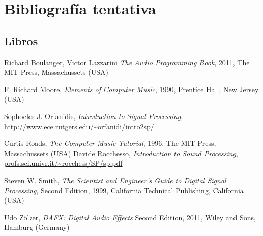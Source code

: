 \documentclass[a4paper,spanish,12pt]{article}
\begin{document}


    
    \maketitle
    
\newpage
\tableofcontents
\newpage

\newpage

\newpage

\newpage



\newpage\section{Bibliografía tentativa}
\subsection{Libros}
\begin{thebibliography}{9}
  Richard Boulanger, Victor Lazzarini
  \emph{The Audio Programming Book},
  2011, The MIT Press, Massachussets (USA)
 
  F. Richard Moore,
  \emph{Elements of Computer Music},
  1990, Prentice Hall, New Jersey (USA)

  Sophocles J. Orfanidis,
  \emph{Introduction to Signal Processing}, \\
  \url{http://www.ece.rutgers.edu/~orfanidi/intro2sp/}
  
  Curtis Roads,
  \emph{The Computer Music Tutorial},
  1996, The MIT Press, Massachussets (USA)
  Davide Rocchesso,
  \emph{Introduction to Sound Processing},
  \url{profs.sci.univr.it/~rocchess/SP/sp.pdf}
  
  Steven W. Smith,
  \emph{The Scientist and Engineer's Guide to Digital Signal Processing},
  Second Edition, 1999, California Technical Publishing, California (USA)
  
  Udo Zölzer,
  \emph{DAFX: Digital Audio Effects}
  Second Edition, 2011, Wiley and Sons, Hamburg (Germany)
\end{thebibliography}
  
\end{document}
